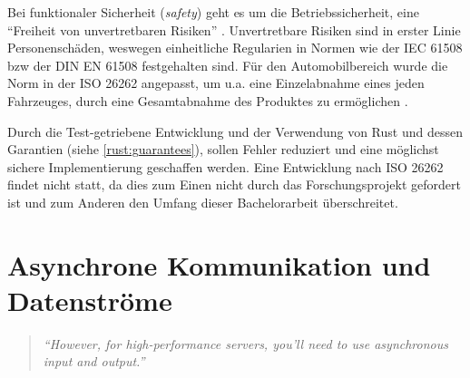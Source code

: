 Bei funktionaler Sicherheit (\textit{safety}) geht es um die Betriebssicherheit, eine \enquote{Freiheit von unvertretbaren Risiken} \cite[6]{safety}.
Unvertretbare Risiken sind in erster Linie Personenschäden, weswegen einheitliche Regularien in Normen wie der IEC 61508 bzw der DIN EN 61508 festgehalten sind.
Für den Automobilbereich wurde die Norm in der ISO 26262 angepasst, um u.a. eine Einzelabnahme eines jeden Fahrzeuges, durch eine Gesamtabnahme des Produktes zu ermöglichen \cite[14]{safety}.

Durch die Test-getriebene Entwicklung und der Verwendung von Rust und dessen Garantien (siehe \autoref{rust:guarantees}), sollen Fehler reduziert und eine möglichst sichere Implementierung geschaffen werden.
Eine Entwicklung nach ISO 26262 findet nicht statt, da dies zum Einen nicht durch das Forschungsprojekt gefordert ist und zum Anderen den Umfang dieser Bachelorarbeit überschreitet.


	
	
	


\section{Asynchrone Kommunikation und Datenströme}

\begin{quotation}
	\textit{\enquote{However, for high-performance servers, you'll need to use asynchronous input and output.}}
	\cite[454]{rust:orly_programming}
\end{quotation}

